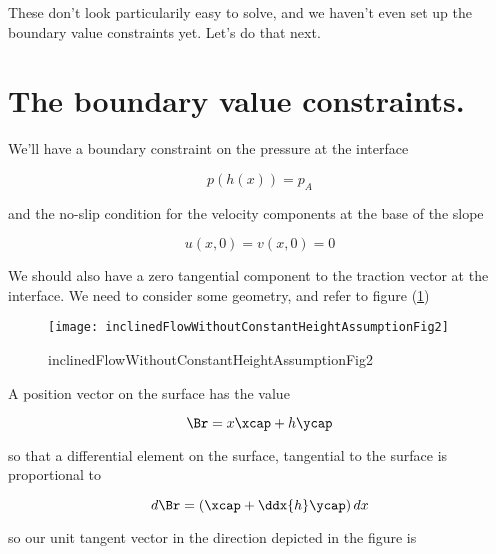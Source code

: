 These don't look particularily easy to solve, and we haven't even set up the boundary value constraints yet.  Let's do that next.

\section{The boundary value constraints.}

We'll have a boundary constraint on the pressure at the interface

\begin{equation}\label{eqn:inclinedFlowWithoutConstantHeightAssumption:60}
p(h(x)) = p_A
\end{equation}

and the no-slip condition for the velocity components at the base of the slope

\begin{equation}\label{eqn:inclinedFlowWithoutConstantHeightAssumption:80}
u(x, 0) = v(x, 0) = 0
\end{equation}

We should also have a zero tangential component to the traction vector at the interface.  We need to consider some geometry, and refer to figure (\ref{fig:inclinedFlowWithoutConstantHeightAssumption:inclinedFlowWithoutConstantHeightAssumptionFig2})

\begin{figure}[htp]
   \centering
   \texttt{[image: inclinedFlowWithoutConstantHeightAssumptionFig2]}
   \caption{inclinedFlowWithoutConstantHeightAssumptionFig2}\label{fig:inclinedFlowWithoutConstantHeightAssumption:inclinedFlowWithoutConstantHeightAssumptionFig2}
\end{figure}

A position vector on the surface has the value

\begin{equation}\label{eqn:inclinedFlowWithoutConstantHeightAssumption:100}
\Br = x \xcap + h \ycap
\end{equation}

so that a differential element on the surface, tangential to the surface is proportional to

\begin{equation}\label{eqn:inclinedFlowWithoutConstantHeightAssumption:120}
d\Br = \left( \xcap + \ddx{h} \ycap \right) dx
\end{equation}

so our unit tangent vector in the direction depicted in the figure is

